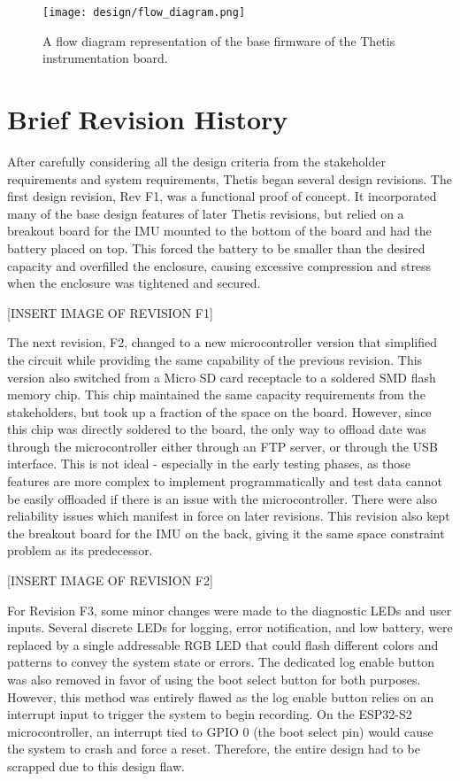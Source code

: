 \begin{figure}[h!]
	\label{fig:thetis_flow_diagram}
	\caption[Base Firmware Flow Diagram]{A flow diagram representation of the base firmware of the Thetis instrumentation board.}
	\centering
	\texttt{[image: design/flow\_diagram.png]}
\end{figure}

\section{Brief Revision History} \label{sec:revision_history}
After carefully considering all the design criteria from the stakeholder requirements and system requirements, Thetis began several design revisions.
The first design revision, Rev F1, was a functional proof of concept.
It incorporated many of the base design features of later Thetis revisions, but relied on a breakout board for the IMU mounted to the bottom of the board and had the battery placed on top.
This forced the battery to be smaller than the desired capacity and overfilled the enclosure, causing excessive compression and stress when the enclosure was tightened and secured.

[INSERT IMAGE OF REVISION F1]

The next revision, F2, changed to a new microcontroller version that simplified the circuit while providing the same capability of the previous revision.
This version also switched from a Micro SD card receptacle to a soldered SMD flash memory chip.
This chip maintained the same capacity requirements from the stakeholders, but took up a fraction of the space on the board.
However, since this chip was directly soldered to the board, the only way to offload date was through the microcontroller either through an FTP server, or through the USB interface.
This is not ideal - especially in the early testing phases, as those features are more complex to implement programmatically and test data cannot be easily offloaded if there is an issue with the microcontroller.
There were also reliability issues which manifest in force on later revisions.
This revision also kept the breakout board for the IMU on the back, giving it the same space constraint problem as its predecessor.

[INSERT IMAGE OF REVISION F2]

For Revision F3, some minor changes were made to the diagnostic LEDs and user inputs.
Several discrete LEDs for logging, error notification, and low battery, were replaced by a single addressable RGB LED that could flash different colors and patterns to convey the system state or errors.
The dedicated log enable button was also removed in favor of using the boot select button for both purposes.
However, this method was entirely flawed as the log enable button relies on an interrupt input to trigger the system to begin recording.
On the ESP32-S2 microcontroller, an interrupt tied to GPIO 0 (the boot select pin) would cause the system to crash and force a reset.
Therefore, the entire design had to be scrapped due to this design flaw.

